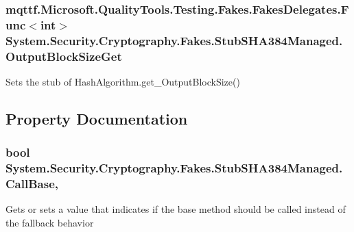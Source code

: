 \hypertarget{class_system_1_1_security_1_1_cryptography_1_1_fakes_1_1_stub_s_h_a384_managed_ab3683f4fda67a36bfb872777acdb0bc1}{
\subsubsection[{Output\-Block\-Size\-Get}]{\setlength{\rightskip}{0pt plus 5cm}mqttf.\-Microsoft.\-Quality\-Tools.\-Testing.\-Fakes.\-Fakes\-Delegates.\-Func$<$int$>$ System.\-Security.\-Cryptography.\-Fakes.\-Stub\-S\-H\-A384\-Managed.\-Output\-Block\-Size\-Get}}\label{class_system_1_1_security_1_1_cryptography_1_1_fakes_1_1_stub_s_h_a384_managed_ab3683f4fda67a36bfb872777acdb0bc1}


Sets the stub of Hash\-Algorithm.\-get\-\_\-\-Output\-Block\-Size()



\subsection{Property Documentation}
\hypertarget{class_system_1_1_security_1_1_cryptography_1_1_fakes_1_1_stub_s_h_a384_managed_aec5763173fedf8301b5dae0c59c21e82}{
\subsubsection[{Call\-Base}]{\setlength{\rightskip}{0pt plus 5cm}bool System.\-Security.\-Cryptography.\-Fakes.\-Stub\-S\-H\-A384\-Managed.\-Call\-Base\hspace{0.3cm}{\ttfamily [get]}, {\ttfamily [set]}}}\label{class_system_1_1_security_1_1_cryptography_1_1_fakes_1_1_stub_s_h_a384_managed_aec5763173fedf8301b5dae0c59c21e82}


Gets or sets a value that indicates if the base method should be called instead of the fallback behavior

